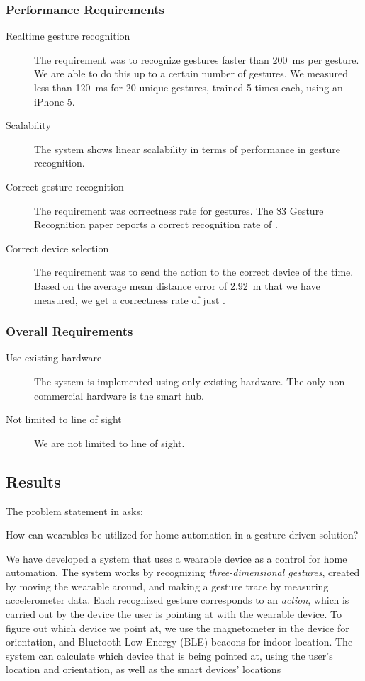 \subsubsection{Performance Requirements}
\begin{description}
  \item[\yes Realtime gesture recognition] The requirement was to recognize gestures faster than \SI{200}{\milli\second} per gesture. We are able to do this up to a certain number of gestures. We measured less than \SI{120}{\milli\second} for \num{20} unique gestures, trained \num{5} times each, using an iPhone 5.
  \item[\yes Scalability] The system shows linear scalability in terms of performance in gesture recognition. 
  \item[\yes Correct gesture recognition] The requirement was  correctness rate for gestures. The \$3 Gesture Recognition paper \cite{threedollar} reports a correct recognition rate of .
  \item[\no Correct device selection] The requirement was to send the action to the correct device  of the time. Based on the average mean distance error of \SI{2.92}{\meter} that we have measured, we get a correctness rate of just . 
\end{description}

\subsubsection{Overall Requirements}
\begin{description}
  \item[\yes Use existing hardware] The system is implemented using only existing hardware. The only non-commercial hardware is the smart hub. 
  \item[\yes Not limited to line of sight] We are not limited to line of sight. 
\end{description}

\subsection{Results}
The problem statement in  asks:
\begin{framed}
  How can wearables be utilized for home automation in a gesture driven solution?
\end{framed}

We have developed a system that uses a wearable device as a control for home automation. 
The system works by recognizing \emph{three-dimensional gestures}, 
created by moving the wearable around, 
and making a gesture trace by measuring accelerometer data. 
Each recognized gesture corresponds to an \emph{action}, 
which is carried out by the device the user is pointing at with the wearable device. 
To figure out which device we point at, 
we use the magnetometer in the device for orientation, 
and Bluetooth Low Energy (BLE) beacons for indoor location. 
The system can calculate which device that is being pointed at, 
using the user's location and orientation, 
as well as the smart devices' locations 

